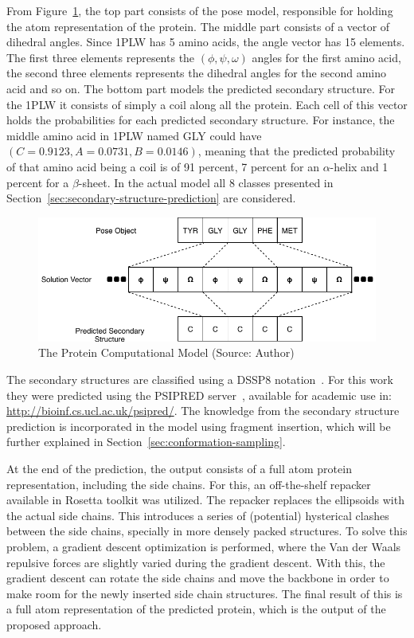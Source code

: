 From Figure~\ref{fig:protein-model}, the top part consists of the pose model,
responsible for holding the atom representation of the protein. The middle part
consists of a vector of dihedral angles. Since 1PLW has 5 amino acids, the
angle vector has 15 elements.  The first three elements represents the $(\phi,
\psi, \omega)$ angles for the first amino acid, the second three elements
represents the dihedral angles for the second amino acid and so on. The bottom
part models the predicted secondary structure. For the 1PLW it consists of
simply a coil along all the protein.  Each cell of this vector holds the
probabilities for each predicted secondary structure.  For instance, the middle
amino acid in 1PLW named GLY could have $(C=0.9123, A=0.0731, B=0.0146)$,
meaning that the predicted probability of that amino acid being a coil is of 91
percent, 7 percent for an $\alpha$-helix and 1 percent for a $\beta$-sheet. In
the actual model all 8 classes presented in
Section~\ref{sec:secondary-structure-prediction} are considered.

\begin{figure}
    \centering
    \includegraphics{Figuras/protein-representation.pdf}
    \vspace{1mm}
    \caption{The Protein Computational Model (Source: Author)}
    \label{fig:protein-model}
\end{figure}

The secondary structures are classified using a DSSP8
notation~\cite{frishman1995knowledge}.  For this work they were predicted using
the PSIPRED server~\cite{mcguffin2000psipred}, available for academic use in:
\url{http://bioinf.cs.ucl.ac.uk/psipred/}.  The knowledge from the secondary
structure prediction is incorporated in the model using fragment insertion,
which will be further explained in Section~\ref{sec:conformation-sampling}.

At the end of the prediction, the output consists of a full atom protein
representation, including the side chains. For this, an off-the-shelf repacker
available in Rosetta toolkit was utilized.  The repacker replaces the
ellipsoids with the actual side chains. This introduces a series of (potential)
hysterical clashes between the side chains, specially in more densely packed
structures. To solve this problem, a gradient descent optimization is
performed, where the Van der Waals repulsive forces are slightly varied during
the gradient descent.  With this, the gradient descent can rotate the side
chains and move the backbone in order to make room for the newly inserted side
chain structures.  The final result of this is a full atom representation of
the predicted protein, which is the output of the proposed approach.

